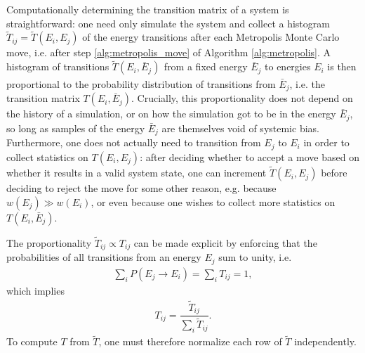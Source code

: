 \documentclass[11pt]{article}
\newcommand{\f}[2]{\dfrac{#1}{#2}} %
\newcommand{\p}[1]{\left(#1\right)} %
\begin{document}
Computationally determining the transition matrix of a system is
straightforward: one need only simulate the system and collect a
histogram $\tilde T_{ij}=\tilde T\p{E_i,E_j}$ of the energy
transitions after each Metropolis Monte Carlo move, i.e. after step
\ref{alg:metropolis_move} of Algorithm \ref{alg:metropolis}. A
histogram of transitions $\tilde T\p{E_i,\bar E_j}_{}$ from a fixed
energy $\bar E_j$ to energies $E_i$ is then proportional to the
probability distribution of transitions from $\bar E_j$, i.e. the
transition matrix $T\p{E_i,\bar E_j}$. Crucially, this proportionality
does not depend on the history of a simulation, or on how the
simulation got to be in the energy $\bar E_j$, so long as samples of
the energy $\bar E_j$ are themselves void of systemic
bias. Furthermore, one does not actually need to transition from $E_j$
to $E_i$ in order to collect statistics on $T\p{E_i,E_j}$: after
deciding whether to accept a move based on whether it results in a
valid system state, one can increment $\tilde T\p{E_i,E_j}$ before
deciding to reject the move for some other reason, e.g. because
$w\p{E_j}\gg w\p{E_i}$, or even because one wishes to collect more
statistics on $T\p{E_i,\bar E_j}$.

The proportionality $\tilde T_{ij}\propto T_{ij}$ can be made explicit
by enforcing that the probabilities of all transitions from an energy
$E_j$ sum to unity, i.e.
\begin{align}
  \sum_iP\p{E_j\to E_i}=\sum_iT_{ij}=1,
  \label{eq:transition_norm_condition}
\end{align}
which implies
\begin{align}
  T_{ij}=\f{\tilde T_{ij}}{\sum_i\tilde T_{ij}}.
  \label{eq:transition_normalization}
\end{align}
To compute $T$ from $\tilde T$, one must therefore normalize each row
of $\tilde T$ independently.
\end{document}
